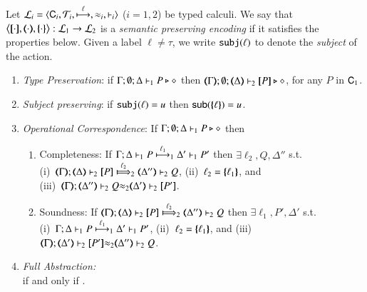 \begin{definition}\myrm
\label{def:ep}
	Let
	$\tyl{L}_i=\calc{\CAL_i}{{\cal{T}}_i}{\hby{\ell}}{\WB_i}{\proves_i}$
	($i=1,2$) be typed calculi. 
	We say that
	$\enco{\map{\cdot}, \mapt{\cdot}, \mapa{\cdot}}: \tyl{L}_1 \to \tyl{L}_2$
	is a \emph{semantic preserving encoding}
	if it satisfies the properties below.
	Given a label $\ell \neq \tau$, we write 
	$\subj{\ell}$
	to denote the \emph{subject} of the action.
	
	\begin{enumerate}[1.]
		\item	\emph{Type Preservation}:
			if
			$\Gamma; \emptyset; \Delta \proves_1 P \hastype \Proc$ then 
			$\mapt{\Gamma}; \emptyset; \mapt{\Delta} \proves_2 \map{P} \hastype \Proc$,  
			for any   $P$ in $\CAL_1$.
		\item	\emph{Subject preserving}: if $\subj{\ell} = u$ then $\mathsf{sub}(\mapa{\ell}) =u$.


		\item	\emph{Operational Correspondence}:
			If $\Gamma; \emptyset; \Delta \proves_1 P \hastype \Proc$ then
			\begin{enumerate}
				\item	Completeness: 
					If  
					$\stytraargi{\Gamma}{\ell_1}{\Delta}{P}{\Delta'}{P'}{1}{1}$
					then $\exists \ell_2, Q, \Delta''$ s.t. \\
					(i)~$\wtytraargi{\mapt{\Gamma}}{\ell_2}{\mapt{\Delta}}{\map{P}}{\mapt{\Delta''}}{Q}{2}{2}$,
					(ii)~$\ell_2 = \mapa{\ell_1}$, 
					and \\
					(iii)~${\mapt{\Gamma}};{\mapt{\Delta''}}\proves_2 {Q}{\WB_2}{\mapt{\Delta'}}\proves_2 {\map{P'}}$.
				
				\item	Soundness:   
					If  $\wtytraargi{\mapt{\Gamma}}{\ell_2}{\mapt{\Delta}}{\map{P}}{\mapt{\Delta''}}{Q}{2}{2}$
					then $\exists \ell_1, P', \Delta'$ s.t.  \\
					(i)~$\stytraargi{\Gamma}{\ell_1}{\Delta}{P}{\Delta'}{P'}{1}{1}$,
					(ii)~$\ell_2 = \mapa{\ell_1}$, and
					(iii)~
					${\mapt{\Gamma}};{\mapt{\Delta'}}\proves_2 {\map{P'}}{\WB_2}
					{\mapt{\Delta''}}\proves_2 {Q}$.
		\end{enumerate}
		
		\item	\emph{Full Abstraction:} \\
			if and only if
			.
	\end{enumerate}
\end{definition}

